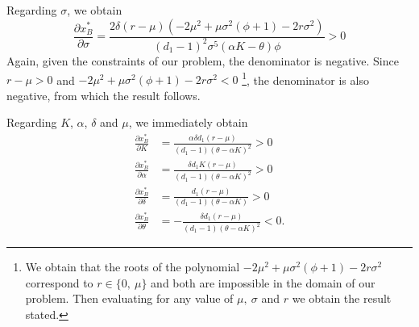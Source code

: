 
Regarding $\sigma$, we obtain
\begin{equation}
\frac{\partial x^*_B}{\partial \sigma}=\frac{2 \delta  (r-\mu) \left(-2 \mu ^2+\mu  \sigma ^2 \left(\phi+1\right)-2 r \sigma ^2\right)}{(d_1-1)^2 \sigma ^5 (\alpha  K-\theta ) \phi}>0
\label{1_xBs}
\end{equation}
Again, given the constraints of our problem, the denominator is negative.
Since $r-\mu>0$ and $-2 \mu ^2+\mu  \sigma ^2 \left(\phi+1\right)-2 r \sigma ^2<0$
\footnote{We obtain that the roots of the polynomial $-2 \mu ^2+\mu  \sigma ^2 \left(\phi+1\right)-2 r \sigma ^2$ correspond to $r \in \{0, \ \mu \}$ and both are impossible in the domain of our problem. Then evaluating for any value of $\mu, \ \sigma$ and $r$ we obtain the result stated.}, the denominator is also negative, from which the result follows.




Regarding $K$, $\alpha$, $\delta$ and $\mu$, we  immediately obtain
\begin{align*}
\frac{\partial x^*_B}{\partial K}&=\frac{\alpha  \delta  d_1 (r-\mu )}{(d_1-1) (\theta -\alpha  K)^2}>0\\
\frac{\partial x^*_B}{\partial \alpha}&=\frac{\delta  d_1 K (r-\mu )}{(d_1-1) (\theta -\alpha K)^2}>0\\
\frac{\partial x^*_B}{\partial \delta}&=\frac{d_1 (r-\mu )}{(d_1-1) (\theta -\alpha  K)}>0\\
\frac{\partial x^*_B}{\partial \theta}&=-\frac{\delta  d_1 (r-\mu )}{(d_1-1) (\theta -\alpha  K)^2}<0.
\end{align*}


